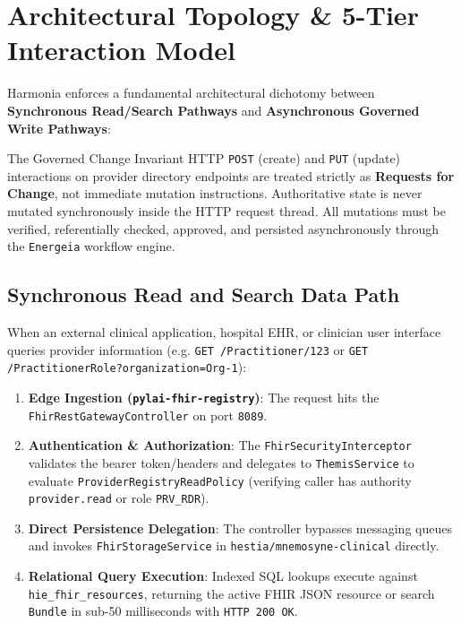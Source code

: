 \section{Architectural Topology \& 5-Tier Interaction Model}
\label{sec:pr_topology}

Harmonia enforces a fundamental architectural dichotomy between \textbf{Synchronous Read/Search Pathways} and \textbf{Asynchronous Governed Write Pathways}:

\begin{principlebox}{The Governed Change Invariant}
HTTP \texttt{POST} (create) and \texttt{PUT} (update) interactions on provider directory endpoints are treated strictly as \textbf{Requests for Change}, not immediate mutation instructions. Authoritative state is never mutated synchronously inside the HTTP request thread. All mutations must be verified, referentially checked, approved, and persisted asynchronously through the \texttt{Energeia} workflow engine.
\end{principlebox}

\subsection{Synchronous Read and Search Data Path}
When an external clinical application, hospital EHR, or clinician user interface queries provider information (e.g. \texttt{GET /Practitioner/123} or \texttt{GET /PractitionerRole?organization=Org-1}):
\begin{enumerate}
    \item \textbf{Edge Ingestion (\texttt{pylai-fhir-registry})}: The request hits the \texttt{FhirRestGatewayController} on port \texttt{8089}.
    \item \textbf{Authentication \& Authorization}: The \texttt{FhirSecurityInterceptor} validates the bearer token/headers and delegates to \texttt{ThemisService} to evaluate \texttt{ProviderRegistryReadPolicy} (verifying caller has authority \texttt{provider.read} or role \texttt{PRV\_RDR}).
    \item \textbf{Direct Persistence Delegation}: The controller bypasses messaging queues and invokes \texttt{FhirStorageService} in \texttt{hestia/mnemosyne-clinical} directly.
    \item \textbf{Relational Query Execution}: Indexed SQL lookups execute against \texttt{hie\_fhir\_resources}, returning the active FHIR JSON resource or search \texttt{Bundle} in sub-50 milliseconds with \texttt{HTTP 200 OK}.
\end{enumerate}

